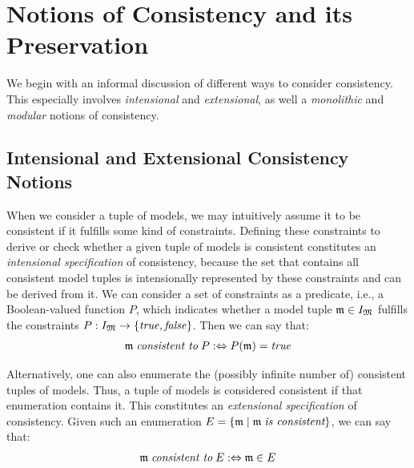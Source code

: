 \section{Notions of Consistency and its Preservation}
\label{chap:correctness:notions_consistency}

We begin with an informal discussion of different ways to consider consistency. This especially involves \emph{intensional} and \emph{extensional}, as well a \emph{monolithic} and \emph{modular} notions of consistency.

\subsection{Intensional and Extensional Consistency Notions}
\label{chap:correctness:notions_consistency:intensional_extensional}

When we consider a tuple of models, we may intuitively assume it to be consistent if it fulfills some kind of constraints.
Defining these constraints to derive or check whether a given tuple of models is consistent constitutes an \emph{intensional specification} of consistency, because the set that contains all consistent model tuples is intensionally represented by these constraints and can be derived from it.
We can consider a set of constraints as a predicate, i.e., a Boolean-valued function $P$, which indicates whether a model tuple $\modeltuple{m} \in \metamodeltupleinstanceset{M}$ fulfills the constraints $P: \metamodeltupleinstanceset{M} \rightarrow \setted{\truemath, \falsemath}$. Then we can say that:
\begin{align*}
    \modeltuple{m} \consistenttomath P \equivalentperdefinition P(\modeltuple{m}) = \truemath
\end{align*}

Alternatively, one can also enumerate the (possibly infinite number of) consistent tuples of models.
Thus, a tuple of models is considered consistent if that enumeration contains it.
This constitutes an \emph{extensional specification} of consistency.
Given such an enumeration $E = \setted{\modeltuple{m} \mid \modeltuple{m} \mathtextspacebefore{is consistent}}$, we can say that:
\begin{align*}
    \modeltuple{m} \consistenttomath E \equivalentperdefinition \modeltuple{m} \in E
\end{align*}

